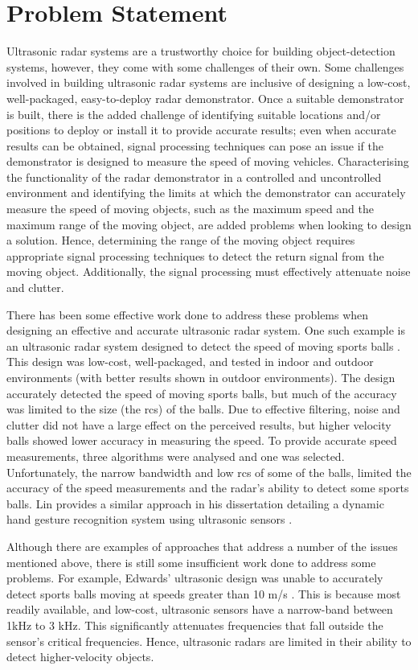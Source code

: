 \documentclass[class=report,11pt,crop=false]{standalone}
\begin{document}
\section{Problem Statement}
Ultrasonic \gls{radar} systems are a trustworthy choice for building object-detection systems, however, they come with some challenges of their own. Some challenges involved in building ultrasonic \gls{radar} systems are inclusive of designing a low-cost, well-packaged, easy-to-deploy radar demonstrator. Once a suitable demonstrator is built, there is the added challenge of identifying suitable locations and/or positions to deploy or install it to provide accurate results; even when accurate results can be obtained, signal processing techniques can pose an issue if the demonstrator is designed to measure the speed of moving vehicles. Characterising the functionality of the radar demonstrator in a controlled and uncontrolled environment and identifying the limits at which the demonstrator can accurately measure the speed of moving objects, such as the maximum speed and the maximum range of the moving object, are added problems when looking to design a solution. Hence, determining the range of the moving object requires appropriate signal processing techniques to detect the return signal from the moving object. Additionally, the signal processing must effectively attenuate noise and clutter.

There has been some effective work done to address these problems when designing an effective and accurate ultrasonic radar system. One such example is an ultrasonic radar system designed to detect the speed of moving sports balls \cite{ian}. This design was low-cost, well-packaged, and tested in indoor and outdoor environments (with better results shown in outdoor environments). The design accurately detected the speed of moving sports balls, but much of the accuracy was limited to the size (the \gls{rcs}) of the balls. Due to effective filtering, noise and clutter did not have a large effect on the perceived results, but higher velocity balls showed lower accuracy in measuring the speed. To provide accurate speed measurements, three algorithms were analysed and one was selected. Unfortunately, the narrow bandwidth and low \gls{rcs} of some of the balls, limited the accuracy of the speed measurements and the radar's ability to detect some sports balls. Lin provides a similar approach in his dissertation detailing a dynamic hand gesture recognition system using ultrasonic sensors \cite{clin}.

Although there are examples of approaches that address a number of the issues mentioned above, there is still some insufficient work done to address some problems. For example, Edwards' ultrasonic design was unable to accurately detect sports balls moving at speeds greater than 10 m/s \cite{ian}. This is because most readily available, and low-cost, ultrasonic sensors have a narrow-band between 1kHz to 3 kHz. This significantly attenuates frequencies that fall outside the sensor's critical frequencies. Hence, ultrasonic radars are limited in their ability to detect higher-velocity objects. 
\end{document}
